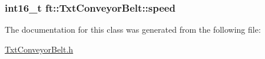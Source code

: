 \subsubsection[{\texorpdfstring{speed}{speed}}]{\setlength{\rightskip}{0pt plus 5cm}int16\+\_\+t ft\+::\+Txt\+Conveyor\+Belt\+::speed\hspace{0.3cm}{\ttfamily [protected]}}\hypertarget{classft_1_1_txt_conveyor_belt_ac5f6a0524423c76eead496610584782d}{}\label{classft_1_1_txt_conveyor_belt_ac5f6a0524423c76eead496610584782d}


The documentation for this class was generated from the following file\+:\begin{DoxyCompactItemize}
\item 
\hyperlink{_txt_conveyor_belt_8h}{Txt\+Conveyor\+Belt.\+h}\end{DoxyCompactItemize}
